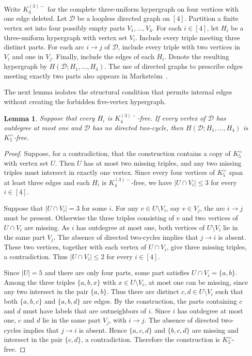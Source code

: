 \documentclass[11pt]{article}
\newtheorem{lemma}[theorem]{Lemma}
\theoremstyle{remark}
\numberwithin{equation}{section}
\newcommand{\F}{K_5^{=}}
\newcommand{\Km}{K_4^{(3)-}}
\begin{document}
Write $\Km$ for the complete three-uniform hypergraph on four vertices
with one edge deleted.
Let $\mathcal D$ be a loopless directed graph on $[4]$. Partition a finite
vertex set into four possibly empty parts $V_1,\ldots,V_4$.
For each $i\in[4]$, let $H_i$ be a three-uniform
hypergraph with vertex set $V_i$. Include every triple meeting three distinct parts.
For each arc $i\to j$ of $\mathcal D$, include every triple with two vertices in
$V_i$ and one in $V_j$. Finally, include the edges of each $H_i$.
Denote the resulting hypergraph by $H(\mathcal D;H_1,\ldots,H_4)$.
The use of directed graphs to prescribe edges meeting exactly two parts
also appears in Markstr\"om~\cite{Markstrom}.

The next lemma isolates the structural condition that permits internal
edges without creating the forbidden five-vertex hypergraph.

\begin{lemma}\label{lem:free}
Suppose that every $H_i$ is $\Km$-free. If every vertex of $\mathcal D$ has outdegree
at most one and $\mathcal D$ has no directed two-cycle, then
$H(\mathcal D;H_1,\ldots,H_4)$ is $\F$-free.
\end{lemma}

\begin{proof}
Suppose, for a contradiction, that the construction contains a copy of
$\F$ with vertex set $U$. Then $U$ has at most two missing triples, and
any two missing triples must intersect in exactly one vertex. Since
every four vertices of $\F$ span at least three edges and each $H_i$ is
$\Km$-free, we have $|U\cap V_i|\le3$ for every $i\in[4]$.

Suppose that $|U\cap V_i|=3$ for some $i$. For any
$v\in U\setminus V_i$, say $v\in V_j$, the arc $i\to j$ must be present. Otherwise the three triples consisting of $v$ and two vertices of
$U\cap V_i$ are missing. As $i$ has outdegree at most one, both vertices
of $U\setminus V_i$ lie in the same part $V_j$. The absence of directed
two-cycles implies that $j\to i$ is absent. These two vertices, together
with each vertex of $U\cap V_i$, give three missing triples, a
contradiction. Thus $|U\cap V_i|\le2$ for every $i\in[4]$.

Since $|U|=5$ and there are only four parts, some part satisfies
$U\cap V_i=\{a,b\}$. Among the three triples $\{a,b,x\}$ with
$x\in U\setminus V_i$, at most one can be missing, since any two
intersect in the pair $\{a,b\}$. Thus there are distinct
$c,d\in U\setminus V_i$ such that both $\{a,b,c\}$ and $\{a,b,d\}$
are edges. By the construction, the parts containing $c$ and $d$ must
have labels that are outneighbors of $i$. Since $i$ has outdegree at
most one, $c$ and $d$ lie in the same part $V_j$, with $i\to j$.
The absence of directed two-cycles implies that $j\to i$ is absent.
Hence $\{a,c,d\}$ and $\{b,c,d\}$ are missing and intersect in the
pair $\{c,d\}$, a contradiction. Therefore the construction is
$\F$-free.
\end{proof}
\end{document}
